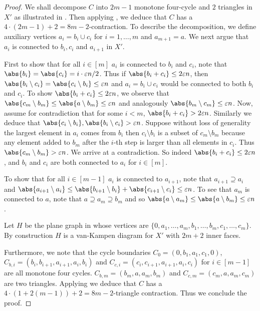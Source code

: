 \begin{proof}
We shall decompose $C$ into $2m-1$ monotone four-cycle and $2$ triangles in $X'$ as illustrated in . Then applying , we deduce that $C$ has a $4\cdot (2m -1 )+ 2 = 8m-2$-contraction. To describe the decomposition, we define auxiliary vertices $a_i = b_i\cup c_i$ for $i=1,\dots,m$ and $a_{m+1} = a$. We next argue that $a_i$ is connected to $b_i, c_i$ and $a_{i+1}$ in $X'$. 

First to show that for all $i\in[m]$ $a_i$ is connected to $b_i$ and $c_i$, note that $\abs{b_i} = \abs{c_i} = i\cdot \varepsilon n/2$. Thus if $\abs{b_i + c_i} \le 2\varepsilon n$, then $\abs{b_i\setminus c_i} = \abs{c_i\setminus b_i} \le \varepsilon n$ and $a_i=b_i\cup c_i$ would be connected to both $b_i$ and $c_i$. To show $\abs{b_i + c_i} \le 2\varepsilon n$, we observe that $\abs{c_m \setminus b_m} \le \abs{a\setminus b_m} \le \varepsilon n$ and analogously $\abs{b_m \setminus c_m} \le \varepsilon n$. Now, assume for contradiction that for some $i< m$, $\abs{b_i + c_i} > 2\varepsilon n$. Similarly we deduce that $\abs{c_i \setminus b_i} , \abs{b_i \setminus c_i} > \varepsilon n$. Suppose without loss of generality the largest element in $a_i$ comes from $b_i$ then $c_i\setminus b_i$ is a subset of $c_m \setminus b_m$ because any element added to \(b_m\) after the $i$-th step is larger than all elements in \(c_i\). Thus $\abs{c_m \setminus b_m}> \varepsilon n$. We arrive at a contradiction. So indeed $\abs{b_i + c_i} \le 2\varepsilon n$, and $b_i$ and $c_i$ are both connected to $a_i$ for $i\in[m]$.

To show that for all $i\in[m-1]$ $a_i$ is connected to $a_{i+1}$, note that $a_{i+1} \supseteq a_i$ and $\abs{a_{i+1}\setminus a_i} \le \abs{b_{i+1}\setminus b_i} + \abs{c_{i+1}\setminus c_i} \le \varepsilon n$. 
To see that $a_m$ is connected to $a$, note that $a \supseteq a_m \supseteq b_m$ and so $\abs{a\setminus a_m} \le \abs{a\setminus b_m}\le \varepsilon n$. 

Let $H$ be the plane graph in  whose vertices are $\{0,a_1,\dots,a_m,b_1,\dots, b_m, c_1,\dots, c_m\}$. By construction $H$ is a van-Kampen diagram for $X'$ with $2m+2$ inner faces. 

Furthermore, we note that the cycle boundaries $C_0 = (0,b_1,a_1,c_1,0)$, $C_{b,i} = (b_i,b_{i+1},a_{i+1},a_i,b_i)$ and $C_{c,i} = (c_i,c_{i+1},a_{i+1},a_i,c_i)$ for $i\in [m-1]$ are all monotone four cycles. $C_{b,m} =(b_m,a,a_m,b_m)$ and $C_{c,m} = (c_m,a,a_m,c_m)$ are two triangles. Applying  we deduce that $C$ has a $4\cdot (1+2(m-1)) + 2 = 8m - 2$-triangle contraction. Thus we conclude the proof.

    

\end{proof}

